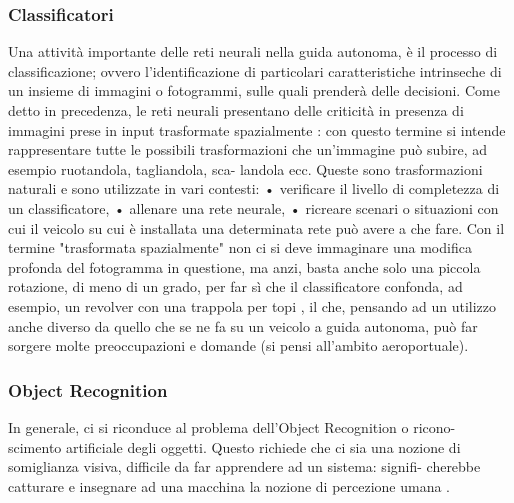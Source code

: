 \documentclass[14pt]{extarticle}
\begin{document}
\subsubsection{Classificatori}
Una attività importante delle reti neurali nella guida autonoma, è il processo di classificazione; ovvero l'identificazione di particolari caratteristiche  intrinseche di un insieme di immagini o fotogrammi, sulle quali prenderà delle decisioni.
Come detto in precedenza, le reti neurali presentano delle criticità in presenza di immagini prese in input trasformate spazialmente \cite{engstrom2019exploring}: con
questo termine si intende rappresentare tutte le possibili trasformazioni
che un’immagine può subire, ad esempio ruotandola, tagliandola, sca-
landola ecc. Queste sono trasformazioni naturali e sono utilizzate in vari
contesti:
• verificare il livello di completezza di un classificatore,
• allenare una rete neurale,
• ricreare scenari o situazioni con cui il veicolo su cui è installata una
determinata rete può avere a che fare.
Con il termine "trasformata spazialmente" non ci si deve immaginare
una modifica profonda del fotogramma in questione, ma anzi, basta
anche solo una piccola rotazione, di meno di un grado, per far sì che il
classificatore confonda, ad esempio, un revolver con una trappola per topi
\cite{engstrom2019exploring}, il che, pensando ad un utilizzo anche diverso da quello che se ne fa
su un veicolo a guida autonoma, può far sorgere molte preoccupazioni e
domande (si pensi all’ambito aeroportuale).

\subsubsection{Object Recognition}
In generale, ci si riconduce al problema dell’Object Recognition o ricono-
scimento artificiale degli oggetti. Questo richiede che ci sia una nozione
di somiglianza visiva, difficile da far apprendere ad un sistema: signifi-
cherebbe catturare e insegnare ad una macchina la nozione di percezione
umana \cite{engstrom2019exploring}.

\end{document}
